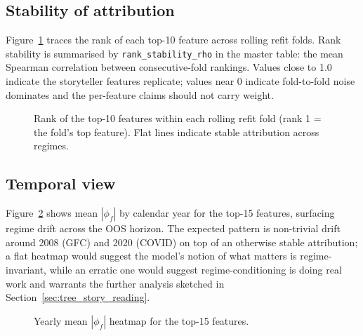 \subsection{Stability of attribution}
\label{sec:tree_story_stability}

Figure~\ref{fig:shap_rank_stability} traces the rank of each top-10
feature across rolling refit folds. Rank stability is summarised by
\texttt{rank\_stability\_rho} in the master table: the mean Spearman
correlation between consecutive-fold rankings. Values close to 1.0
indicate the storyteller features replicate; values near 0 indicate
fold-to-fold noise dominates and the per-feature claims should not
carry weight.

\begin{figure}[H]
\centering
\hfill
{}
\caption{Rank of the top-10 features within each rolling refit fold
(rank 1 = the fold's top feature). Flat lines indicate stable
attribution across regimes.}
\label{fig:shap_rank_stability}
\end{figure}

\subsection{Temporal view}
\label{sec:tree_story_temporal}

Figure~\ref{fig:shap_yearly_heatmap} shows mean $|\phi_f|$ by
calendar year for the top-15 features, surfacing regime drift across
the OOS horizon. The expected pattern is non-trivial drift around
2008 (GFC) and 2020 (COVID) on top of an otherwise stable
attribution; a flat heatmap would suggest the model's notion of what
matters is regime-invariant, while an erratic one would suggest
regime-conditioning is doing real work and warrants the further
analysis sketched in Section~\ref{sec:tree_story_reading}.

\begin{figure}[H]
\centering
\hfill
{}
\caption{Yearly mean $|\phi_f|$ heatmap for the top-15 features.}
\label{fig:shap_yearly_heatmap}
\end{figure}

